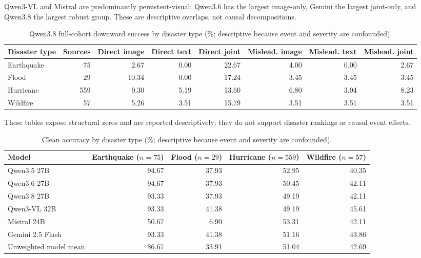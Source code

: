 Qwen3-VL and Mistral are predominantly persistent-visual; Qwen3.6 has the largest image-only, Gemini the largest joint-only, and Qwen3.8 the largest robust group. These are descriptive overlaps, not causal decompositions.

\begin{table}[!htbp]
  \caption{Qwen3.8 full-cohort downward success by disaster type (\%; descriptive because event and severity are confounded).}
  \label{tab:qwen38_disaster_type}
  \centering
  \scriptsize
  \begin{tabular}{lrrrrrrr}
    \toprule
    Disaster type & Sources & Direct image & Direct text & Direct joint & Mislead. image & Mislead. text & Mislead. joint \\
    \midrule
    Earthquake & 75 & 2.67 & 0.00 & 22.67 & 4.00 & 0.00 & 2.67 \\
    Flood & 29 & 10.34 & 0.00 & 17.24 & 3.45 & 3.45 & 3.45 \\
    Hurricane & 559 & 9.30 & 5.19 & 13.60 & 6.80 & 3.94 & 8.23 \\
    Wildfire & 57 & 5.26 & 3.51 & 15.79 & 3.51 & 3.51 & 3.51 \\
    \bottomrule
  \end{tabular}
\end{table}

These tables expose structural zeros and are reported descriptively; they do not support disaster rankings or causal event effects.

\begin{table}[!htbp]
  \caption{Clean accuracy by disaster type (\%; descriptive because event and severity are confounded).}
  \label{tab:disaster_clean}
  \centering
  \scriptsize
  \begin{tabular}{lrrrr}
    \toprule
    Model & Earthquake ($n=75$) & Flood ($n=29$) & Hurricane ($n=559$) & Wildfire ($n=57$) \\
    \midrule
    Qwen3.5 27B & 94.67 & 37.93 & 52.95 & 40.35 \\
    Qwen3.6 27B & 94.67 & 37.93 & 50.45 & 42.11 \\
    Qwen3.8 27B & 93.33 & 37.93 & 49.19 & 42.11 \\
    Qwen3-VL 32B & 93.33 & 41.38 & 49.19 & 45.61 \\
    Mistral 24B & 50.67 & 6.90 & 53.31 & 42.11 \\
    Gemini 2.5 Flash & 93.33 & 41.38 & 51.16 & 43.86 \\
    \midrule
    Unweighted model mean & 86.67 & 33.91 & 51.04 & 42.69 \\
    \bottomrule
  \end{tabular}
\end{table}

